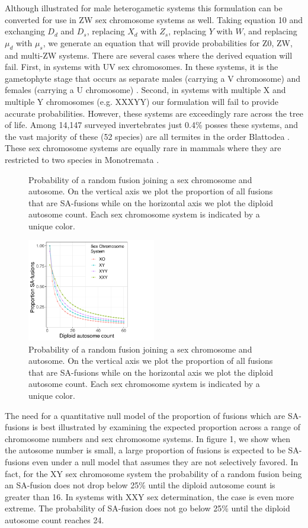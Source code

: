 \documentclass[12pt]{article}
\begin{document}
Although illustrated for male heterogametic systems this formulation can be converted for use in ZW sex chromosome systems as well.
Taking equation 10 and exchanging $D_d$ and $D_s$, replacing $X_d$ with $Z_s$, replacing $Y$ with $W$, and replacing $\mu_d$ with $\mu_s$, we generate an equation that will provide probabilities for Z0, ZW, and multi-ZW systems.
There are several cases where the derived equation will fail.
First, in systems with UV sex chromosomes. 
In these systems, it is the gametophyte stage that occurs as separate males (carrying a V chromosome) and females (carrying a U chromosome) \citep{bachtrog2014sex}.
Second, in systems with multiple X and multiple Y chromosomes (e.g. XXXYY) our formulation will fail to provide accurate probabilities.
However, these systems are exceedingly rare across the tree of life.
Among 14,147 surveyed invertebrates just 0.4\% posses these systems, and the vast majority of these (52 species) are all termites in the order Blattodea \citep{blackmon2017}. 
These sex chromosome systems are equally rare in mammals where they are restricted to two species in Monotremata \citep{ashman2014tree}.

\begin{figure} %
\caption{Probability of a random fusion joining a sex chromosome and autosome. On the vertical axis we plot the proportion of all fusions that are SA-fusions while on the horizontal axis we plot the diploid autosome count. Each sex chromosome system is indicated by a unique color.}
    \centering
    \includegraphics[width=0.5\textwidth]{autosome.num.pdf}
\caption{Probability of a random fusion joining a sex chromosome and autosome. On the vertical axis we plot the proportion of all fusions that are SA-fusions while on the horizontal axis we plot the diploid autosome count. Each sex chromosome system is indicated by a unique color.}
\end{figure}

The need for a quantitative null model of the proportion of fusions which are SA-fusions is best illustrated by examining the expected proportion across a range of chromosome numbers and sex chromosome systems.
In figure 1, we show when the autosome number is small, a large proportion of fusions is expected to be SA-fusions even under a null model that assumes they are not selectively favored. 
In fact, for the XY sex chromosome system the probability of a random fusion being an SA-fusion does not drop below 25\% until the diploid autosome count is greater than 16. 
In systems with XXY sex determination, the case is even more extreme. The probability of SA-fusion does not go below 25\% until the diploid autosome count reaches 24.
\end{document}

